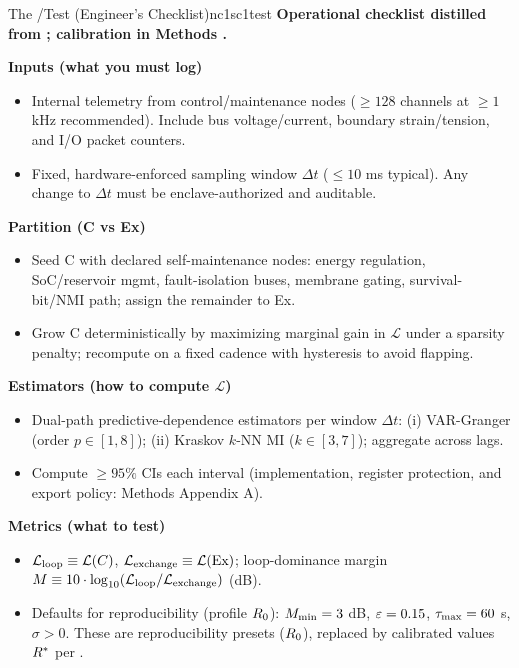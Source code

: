 \documentclass[11pt]{article}
\begin{document}
\begin{docbox}{The \NC/\SC Test (Engineer's Checklist)}{nc1sc1test}
\textbf{Operational checklist distilled from ; calibration in Methods .}

\textbf{Inputs (what you must log)}
\begin{itemize}
\item Internal telemetry from control/maintenance nodes ($\geq 128$ channels at $\geq 1$ kHz recommended). Include bus voltage/current, boundary strain/tension, and I/O packet counters.
\item Fixed, hardware-enforced sampling window $\Delta t$ ($\leq 10$ ms typical). Any change to $\Delta t$ must be enclave-authorized and auditable.
\end{itemize}

\textbf{Partition (C vs Ex)}
\begin{itemize}
\item Seed C with declared self-maintenance nodes: energy regulation, SoC/reservoir mgmt, fault-isolation buses, membrane gating, survival-bit/NMI path; assign the remainder to Ex.
\item Grow C deterministically by maximizing marginal gain in $\mathcal{L}$ under a sparsity penalty; recompute on a fixed cadence with hysteresis to avoid flapping.
\end{itemize}

\textbf{Estimators (how to compute $\mathcal{L}$)}
\begin{itemize}
\item Dual-path predictive-dependence estimators per window $\Delta t$: (i) VAR-Granger (order $p \in [1,8]$); (ii) Kraskov $k$-NN MI ($k \in [3,7]$); aggregate across lags.
\item Compute $\geq 95\%$ CIs each interval (implementation, register protection, and export policy: Methods Appendix A).
\end{itemize}

\textbf{Metrics (what to test)}
\begin{itemize}
\item $\mathcal{L}_{\text{loop}} \equiv \mathcal{L}(C)$, $\mathcal{L}_{\text{exchange}} \equiv \mathcal{L}(\text{Ex})$; loop-dominance margin $M \equiv 10 \cdot \log_{10}(\mathcal{L}_{\text{loop}}/\mathcal{L}_{\text{exchange}})$ (dB).
\item Defaults for reproducibility (profile $R_0$): $M_{\min} = 3$ dB, $\varepsilon = 0.15$, $\tau_{\max} = 60$ s, $\sigma > 0$. These are reproducibility presets ($R_0$), replaced by calibrated values $R^*$ per .
\end{itemize}


\end{docbox}
\end{document}
